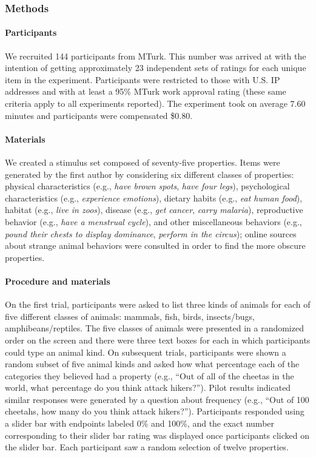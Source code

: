 \documentclass[floatsintext,man]{apa6}
\theoremstyle{definition}
\theoremstyle{definition}
\theoremstyle{definition}
\theoremstyle{remark}
\begin{document}
\subsubsection{Methods}\label{methods}

\paragraph{Participants}\label{participants-2}

We recruited 144 participants from MTurk. This number was arrived at
with the intention of getting approximately 23 independent sets of
ratings for each unique item in the experiment. Participants were
restricted to those with U.S. IP addresses and with at least a 95\%
MTurk work approval rating (these same criteria apply to all experiments
reported). The experiment took on average 7.60 minutes and participants
were compensated \$0.80.

\paragraph{Materials}\label{materials}

We created a stimulus set composed of seventy-five properties. Items
were generated by the first author by considering six different classes
of properties: physical characteristics (e.g., \emph{have brown spots},
\emph{have four legs}), psychological characteristics (e.g.,
\emph{experience emotions}), dietary habits (e.g., \emph{eat human
food}), habitat (e.g., \emph{live in zoos}), disease (e.g., \emph{get
cancer}, \emph{carry malaria}), reproductive behavior (e.g., \emph{have
a menstrual cycle}), and other miscellaneous behaviors (e.g.,
\emph{pound their chests to display dominance}, \emph{perform in the
circus}); online sources about strange animal behaviors were consulted
in order to find the more obscure properties.

\paragraph{Procedure and materials}\label{procedure-and-materials-2}

On the first trial, participants were asked to list three kinds of
animals for each of five different classes of animals: mammals, fish,
birds, insects/bugs, amphibeans/reptiles. The five classes of animals
were presented in a randomized order on the screen and there were three
text boxes for each in which participants could type an animal kind. On
subsequent trials, participants were shown a random subset of five
animal kinds and asked how what percentage each of the categories they
believed had a property (e.g., \enquote{Out of all of the cheetas in the
world, what percentage do you think attack hikers?}). Pilot results
indicated similar responses were generated by a question about frequency
(e.g., \enquote{Out of 100 cheetahs, how many do you think attack
hikers?}). Participants responded using a slider bar with endpoints
labeled 0\% and 100\%, and the exact number corresponding to their
slider bar rating was displayed once participants clicked on the slider
bar. Each participant saw a random selection of twelve properties.
\end{document}
